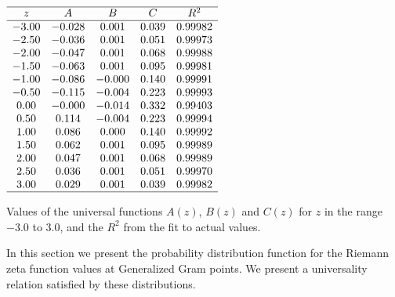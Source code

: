 \documentclass[twoside]{article}
\begin{document}
\begin{table}
\centering \(\begin{array}{ccccccc}
\hline
     z     & A   &      B      &   C    &R^2\\
\hline
-3.00& -0.028&  0.001&  0.039& 0.99982\\
  -2.50& -0.036&  0.001&  0.051& 0.99973\\
  -2.00& -0.047&  0.001&  0.068& 0.99988\\
  -1.50& -0.063&  0.001&  0.095& 0.99981\\
  -1.00& -0.086& -0.000&  0.140& 0.99991\\
  -0.50& -0.115& -0.004&  0.223& 0.99993\\
   0.00& -0.000& -0.014&  0.332& 0.99403\\
   0.50&  0.114& -0.004&  0.223& 0.99994\\
   1.00&  0.086&  0.000&  0.140& 0.99992\\
   1.50&  0.062&  0.001&  0.095& 0.99989\\
   2.00&  0.047&  0.001&  0.068& 0.99989\\
   2.50&  0.036&  0.001&  0.051& 0.99970\\
   3.00&  0.029&  0.001&  0.039& 0.99982\\
\hline
\end{array}\)
\caption{Values of the universal functions $A(z)$, $B(z)$ and $C(z)$ 
for $z$ in the range $-3.0$ to $3.0$, and the $R^2$ from the fit to actual values.} 
\label{tab:coefficients}
\end{table}

In this section we present the probability distribution function for the Riemann zeta function
values at Generalized Gram points. We present a universality relation satisfied by these distributions.
\end{document}
